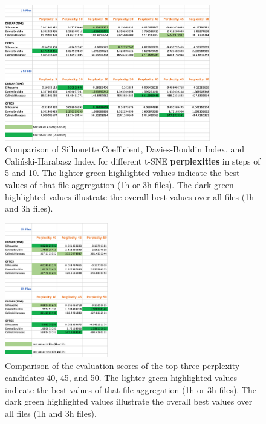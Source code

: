 \begin{figure}
  \centering
  \includegraphics[width=0.8\textwidth]{./images/tsneParametersTest/perplexity/perplexityEvaluationScores.png}
  \caption{Comparison of Silhouette Coefficient, Davies-Bouldin Index, and Caliński-Harabasz Index for different t-SNE \textbf{perplexities} in steps of 5 and 10. The lighter green highlighted values indicate the best values of that file aggregation (1h or 3h files). The dark green highlighted values illustrate the overall best values over all files (1h and 3h files).}
  \label{figure:perplexityEvaluationScores}
\end{figure}


\begin{figure}
  \centering
  \includegraphics[width=0.4\textwidth]{./images/tsneParametersTest/perplexity/perplexityEvaluationScoresDetailed.png}
  \caption{Comparison of the evaluation scores of the top three perplexity candidates 40, 45, and 50. The lighter green highlighted values indicate the best values of that file aggregation (1h or 3h files). The dark green highlighted values illustrate the overall best values over all files (1h and 3h files).}
  \label{figure:perplexityEvaluationScoresDetailed}
\end{figure}


